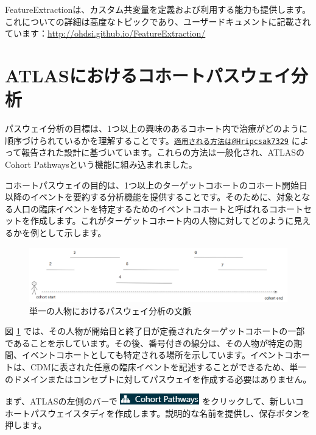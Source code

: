 \documentclass[
  11pt]{book}
\theoremstyle{definition}
\theoremstyle{definition}
\theoremstyle{definition}
\theoremstyle{definition}
\theoremstyle{remark}
\begin{document}
FeatureExtractionは、カスタム共変量を定義および利用する能力も提供します。これについての詳細は高度なトピックであり、ユーザードキュメントに記載されています：\url{http://ohdsi.github.io/FeatureExtraction/}

\section{ATLASにおけるコホートパスウェイ分析}\label{atlasux306bux304aux3051ux308bux30b3ux30dbux30fcux30c8ux30d1ux30b9ux30a6ux30a7ux30a4ux5206ux6790}

パスウェイ分析の目標は、1つ以上の興味のあるコホート内で治療がどのように順序づけられているかを理解することです。\href{mailto:適用される方法は@Hripcsak7329}{\nolinkurl{適用される方法は@Hripcsak7329}} によって報告された設計に基づいています。これらの方法は一般化され、ATLASのCohort Pathwaysという機能に組み込まれました。

コホートパスウェイの目的は、1つ以上のターゲットコホートのコホート開始日以降のイベントを要約する分析機能を提供することです。そのために、対象となる人口の臨床イベントを特定するためのイベントコホートと呼ばれるコホートセットを作成します。これがターゲットコホート内の人物に対してどのように見えるかを例として示します。

\begin{figure}

{\centering \includegraphics[width=1\linewidth]{images/Characterization/pathwaysPersonEventView} 

}

\caption{単一の人物におけるパスウェイ分析の文脈}\label{fig:pathwaysPersonEventView}
\end{figure}

図 \ref{fig:pathwaysPersonEventView} では、その人物が開始日と終了日が定義されたターゲットコホートの一部であることを示しています。その後、番号付きの線分は、その人物が特定の期間、イベントコホートとしても特定される場所を示しています。イベントコホートは、CDMに表された任意の臨床イベントを記述することができるため、単一のドメインまたはコンセプトに対してパスウェイを作成する必要はありません。

まず、ATLASの左側のバーで \includegraphics{images/Characterization/atlasPathwaysMenuItem.png} をクリックして、新しいコホートパスウェイスタディを作成します。説明的な名前を提供し、保存ボタンを押します。
\end{document}
